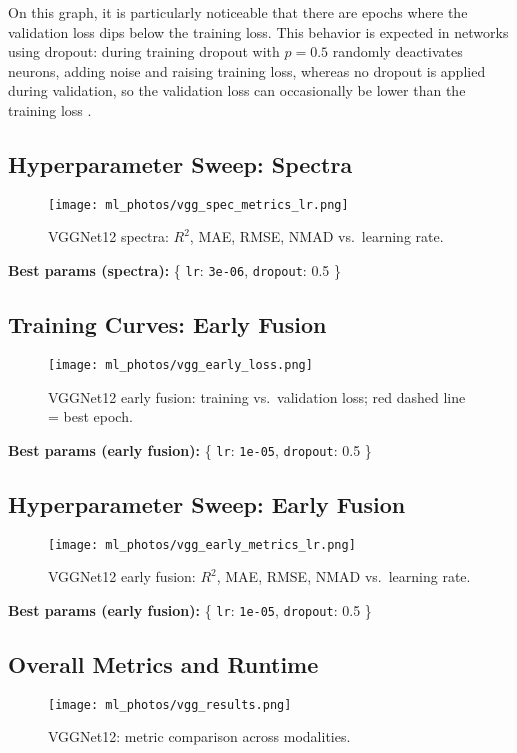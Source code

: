 \documentclass[english,bachelor,oneside]{ctufit-thesis}
\begin{document}
\noindent On this graph, it is particularly noticeable that there are epochs where the validation loss dips below the training loss. This behavior is expected in networks using dropout: during training dropout with $p=0.5$ randomly deactivates neurons, adding noise and raising training loss, whereas no dropout is applied during validation, so the validation loss can occasionally be lower than the training loss \cite{srivastava2014dropout}.


\subsection{Hyperparameter Sweep: Spectra}
\begin{figure}[H]
  \centering
  \texttt{[image: ml\_photos/vgg\_spec\_metrics\_lr.png]}
  \caption{VGGNet12 spectra: $R^2$, MAE, RMSE, NMAD vs.\ learning rate.}
  \label{fig:vgg_spec_metrics}
\end{figure}
\noindent\textbf{Best params (spectra):} \{ \texttt{lr}: \verb|3e-06|, \texttt{dropout}: 0.5 \}\\

\subsection{Training Curves: Early Fusion}
\begin{figure}[H]
  \centering
  \texttt{[image: ml\_photos/vgg\_early\_loss.png]}
  \caption{VGGNet12 early fusion: training vs.\ validation loss; red dashed line = best epoch.}
  \label{fig:vgg_early_loss}
\end{figure}
\noindent\textbf{Best params (early fusion):} \{ \texttt{lr}: \verb|1e-05|, \texttt{dropout}: 0.5 \}\\

\subsection{Hyperparameter Sweep: Early Fusion}
\begin{figure}[H]
  \centering
  \texttt{[image: ml\_photos/vgg\_early\_metrics\_lr.png]}
  \caption{VGGNet12 early fusion: $R^2$, MAE, RMSE, NMAD vs.\ learning rate.}
  \label{fig:vgg_early_metrics}
\end{figure}
\noindent\textbf{Best params (early fusion):} \{ \texttt{lr}: \verb|1e-05|, \texttt{dropout}: 0.5 \}\\

\subsection{Overall Metrics and Runtime}
\begin{figure}[H]
  \centering
  \texttt{[image: ml\_photos/vgg\_results.png]}
  \caption{VGGNet12: metric comparison across modalities.}
  \label{fig:vgg_results}
\end{figure}
\end{document}
